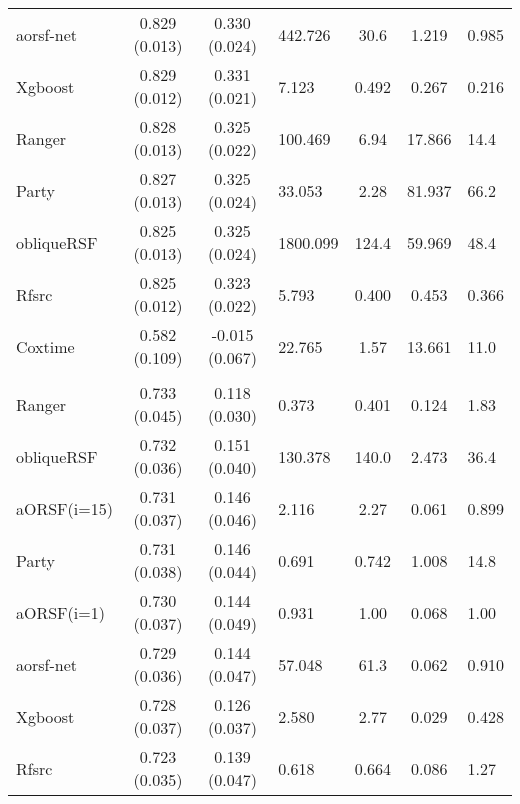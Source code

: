 \documentclass[twoside,11pt]{article}\usepackage[]{graphicx}\usepackage[]{color}
\newenvironment{knitrout}{}{} %
\begin{document}
\begin{knitrout}
\begin{longtable}{lcclccl}
\hspace{1em}aorsf-net & 0.829 (0.013) & 0.330 (0.024) & 442.726 & 30.6 & 1.219 & 0.985\\
\hspace{1em}Xgboost & 0.829 (0.012) & 0.331 (0.021) & 7.123 & 0.492 & 0.267 & 0.216\\
\hspace{1em}Ranger & 0.828 (0.013) & 0.325 (0.022) & 100.469 & 6.94 & 17.866 & 14.4\\
\hspace{1em}Party & 0.827 (0.013) & 0.325 (0.024) & 33.053 & 2.28 & 81.937 & 66.2\\
\hspace{1em}obliqueRSF & 0.825 (0.013) & 0.325 (0.024) & 1800.099 & 124.4 & 59.969 & 48.4\\
\hspace{1em}Rfsrc & 0.825 (0.012) & 0.323 (0.022) & 5.793 & 0.400 & 0.453 & 0.366\\
\hspace{1em}Coxtime & 0.582 (0.109) & -0.015 (0.067) & 22.765 & 1.57 & 13.661 & 11.0\\
\addlinespace[0.3em]
\hline
\multicolumn{7}{l}{\textit{\textbf{gbsg2}}}\\
\hline
\hspace{1em}Ranger & 0.733 (0.045) & 0.118 (0.030) & 0.373 & 0.401 & 0.124 & 1.83\\
\hspace{1em}obliqueRSF & 0.732 (0.036) & 0.151 (0.040) & 130.378 & 140.0 & 2.473 & 36.4\\
\hspace{1em}aORSF(i=15) & 0.731 (0.037) & 0.146 (0.046) & 2.116 & 2.27 & 0.061 & 0.899\\
\hspace{1em}Party & 0.731 (0.038) & 0.146 (0.044) & 0.691 & 0.742 & 1.008 & 14.8\\
\hspace{1em}aORSF(i=1) & 0.730 (0.037) & 0.144 (0.049) & 0.931 & 1.00 & 0.068 & 1.00\\
\hspace{1em}aorsf-net & 0.729 (0.036) & 0.144 (0.047) & 57.048 & 61.3 & 0.062 & 0.910\\
\hspace{1em}Xgboost & 0.728 (0.037) & 0.126 (0.037) & 2.580 & 2.77 & 0.029 & 0.428\\
\hspace{1em}Rfsrc & 0.723 (0.035) & 0.139 (0.047) & 0.618 & 0.664 & 0.086 & 1.27\\

\end{longtable}
\end{knitrout}
\end{document}
